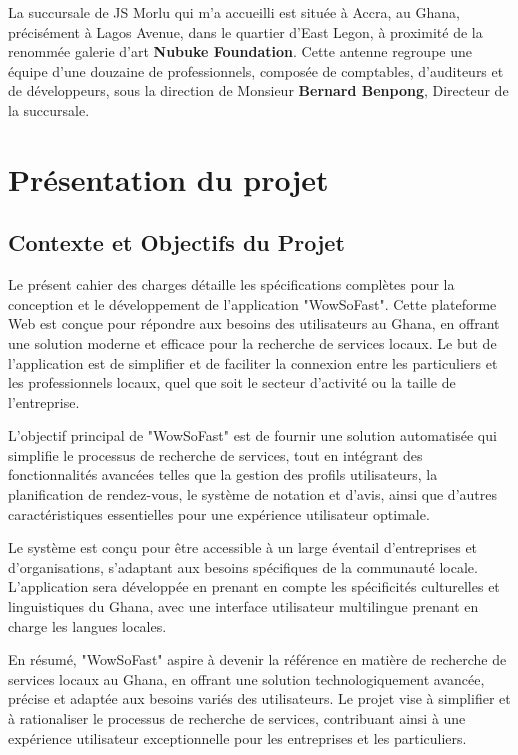 La succursale de JS Morlu qui m'a accueilli est située à Accra, au Ghana, précisément à Lagos Avenue, dans le quartier d'East Legon, à proximité de la renommée galerie d'art \textbf{Nubuke Foundation}. Cette antenne regroupe une équipe d'une douzaine de professionnels, composée de comptables, d'auditeurs et de développeurs, sous la direction de Monsieur \textbf{Bernard Benpong}, Directeur de la succursale.

\chapter{Présentation du projet}

\section{Contexte et Objectifs du Projet}

Le présent cahier des charges détaille les spécifications complètes pour la conception et le développement de l'application "WowSoFast". Cette plateforme Web est conçue pour répondre aux besoins des utilisateurs au Ghana, en offrant une solution moderne et efficace pour la recherche de services locaux. Le but de l'application est de simplifier et de faciliter la connexion entre les particuliers et les professionnels locaux, quel que soit le secteur d'activité ou la taille de l'entreprise.

\vspace{0.5cm}

L'objectif principal de "WowSoFast" est de fournir une solution automatisée qui simplifie le processus de recherche de services, tout en intégrant des fonctionnalités avancées telles que la gestion des profils utilisateurs, la planification de rendez-vous, le système de notation et d'avis, ainsi que d'autres caractéristiques essentielles pour une expérience utilisateur optimale.

\vspace{0.5cm}

Le système est conçu pour être accessible à un large éventail d'entreprises et d'organisations, s'adaptant aux besoins spécifiques de la communauté locale. L'application sera développée en prenant en compte les spécificités culturelles et linguistiques du Ghana, avec une interface utilisateur multilingue prenant en charge les langues locales.

\vspace{0.5cm}

En résumé, "WowSoFast" aspire à devenir la référence en matière de recherche de services locaux au Ghana, en offrant une solution technologiquement avancée, précise et adaptée aux besoins variés des utilisateurs. Le projet vise à simplifier et à rationaliser le processus de recherche de services, contribuant ainsi à une expérience utilisateur exceptionnelle pour les entreprises et les particuliers.
 
